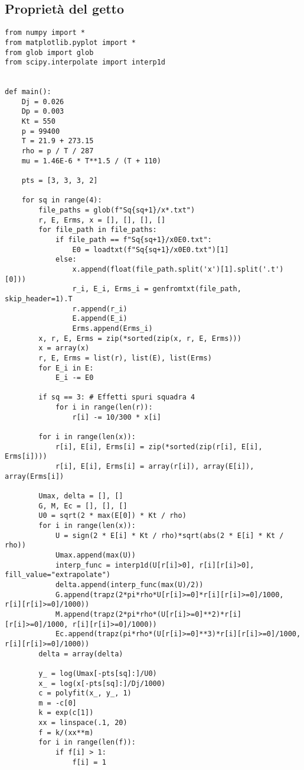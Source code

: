 \subsection{Proprietà del getto}\label{b4}
\begin{lstlisting}
from numpy import *
from matplotlib.pyplot import *
from glob import glob
from scipy.interpolate import interp1d


def main():
    Dj = 0.026
    Dp = 0.003
    Kt = 550
    p = 99400
    T = 21.9 + 273.15
    rho = p / T / 287
    mu = 1.46E-6 * T**1.5 / (T + 110)

    pts = [3, 3, 3, 2]

    for sq in range(4):
        file_paths = glob(f"Sq{sq+1}/x*.txt")
        r, E, Erms, x = [], [], [], []
        for file_path in file_paths:
            if file_path == f"Sq{sq+1}/x0E0.txt":
                E0 = loadtxt(f"Sq{sq+1}/x0E0.txt")[1]
            else:
                x.append(float(file_path.split('x')[1].split('.t')[0]))
                r_i, E_i, Erms_i = genfromtxt(file_path, skip_header=1).T
                r.append(r_i)
                E.append(E_i)
                Erms.append(Erms_i)
        x, r, E, Erms = zip(*sorted(zip(x, r, E, Erms)))
        x = array(x)
        r, E, Erms = list(r), list(E), list(Erms)
        for E_i in E:
            E_i -= E0

        if sq == 3: # Effetti spuri squadra 4
            for i in range(len(r)):
                r[i] -= 10/300 * x[i]

        for i in range(len(x)):
            r[i], E[i], Erms[i] = zip(*sorted(zip(r[i], E[i], Erms[i])))
            r[i], E[i], Erms[i] = array(r[i]), array(E[i]), array(Erms[i])

        Umax, delta = [], []
        G, M, Ec = [], [], []
        U0 = sqrt(2 * max(E[0]) * Kt / rho)
        for i in range(len(x)):
            U = sign(2 * E[i] * Kt / rho)*sqrt(abs(2 * E[i] * Kt / rho))
            Umax.append(max(U))
            interp_func = interp1d(U[r[i]>0], r[i][r[i]>0], fill_value="extrapolate")
            delta.append(interp_func(max(U)/2))
            G.append(trapz(2*pi*rho*U[r[i]>=0]*r[i][r[i]>=0]/1000, r[i][r[i]>=0]/1000))
            M.append(trapz(2*pi*rho*(U[r[i]>=0]**2)*r[i][r[i]>=0]/1000, r[i][r[i]>=0]/1000))
            Ec.append(trapz(pi*rho*(U[r[i]>=0]**3)*r[i][r[i]>=0]/1000, r[i][r[i]>=0]/1000))
        delta = array(delta)

        y_ = log(Umax[-pts[sq]:]/U0)
        x_ = log(x[-pts[sq]:]/Dj/1000)
        c = polyfit(x_, y_, 1)
        m = -c[0]
        k = exp(c[1])
        xx = linspace(.1, 20)
        f = k/(xx**m)
        for i in range(len(f)):
            if f[i] > 1:
                f[i] = 1


\end{lstlisting}
